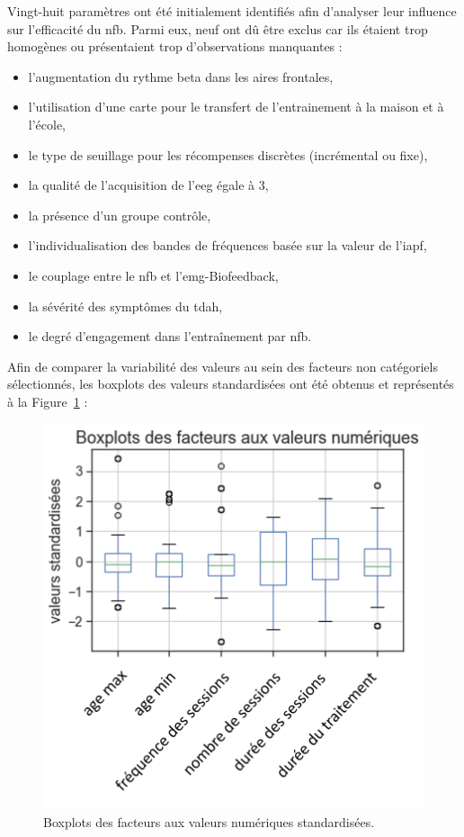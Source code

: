 Vingt-huit paramètres ont été initialement identifiés afin d'analyser leur influence sur l'efficacité du \gls{nfb}. Parmi eux, neuf ont dû être exclus car ils étaient trop
homogènes ou présentaient trop d'observations manquantes : 
\begin{itemize}
	\item l'augmentation du rythme beta dans les aires frontales,
  \item l'utilisation d'une carte pour le transfert de l'entrainement à la maison et à l'école, 
  \item le type de seuillage pour les récompenses discrètes (incrémental ou fixe),
  \item la qualité de l'acquisition de l'\gls{eeg} égale à 3,
	\item la présence d'un groupe contrôle,
	\item l'individualisation des bandes de fréquences basée sur la valeur de l'\gls{iapf},
	\item le couplage entre le \gls{nfb} et l'\gls{emg}-Biofeedback,
	\item la sévérité des symptômes du \gls{tdah},
	\item le degré d'engagement dans l'entraînement par \gls{nfb}.
\end{itemize} 


Afin de comparer la variabilité des valeurs au sein des facteurs non catégoriels sélectionnés, les boxplots des valeurs standardisées ont été obtenus et représentés à la Figure~\ref{Figure:factors-boxplots} :
\begin{figure}[h!]
  \centering
	\includegraphics[width=0.7\linewidth]{figures/chapter-3/factors-distribution-of-factors} 
  \caption{Boxplots des facteurs aux valeurs numériques standardisées.} 
  \label{Figure:factors-boxplots}
\end{figure}

